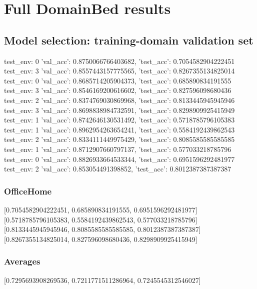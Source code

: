 \documentclass{article}
\begin{document}
\section{Full DomainBed results}

\subsection{Model selection: training-domain validation set}
test_env: 0
{'val_acc': 0.8750066766403682, 'test_acc': 0.7054582904222451}
test_env: 3
{'val_acc': 0.8557443157775565, 'test_acc': 0.8267355134825014}
test_env: 0
{'val_acc': 0.8685714205904373, 'test_acc': 0.685890834191555}
test_env: 3
{'val_acc': 0.8546169200616602, 'test_acc': 0.827596098680436}
test_env: 2
{'val_acc': 0.8374769030869968, 'test_acc': 0.8133445945945946}
test_env: 3
{'val_acc': 0.8698838984732591, 'test_acc': 0.8298909925415949}
test_env: 1
{'val_acc': 0.8742646130531492, 'test_acc': 0.5718785796105383}
test_env: 1
{'val_acc': 0.8962954263654241, 'test_acc': 0.5584192439862543}
test_env: 2
{'val_acc': 0.8334111449975429, 'test_acc': 0.8085585585585585}
test_env: 1
{'val_acc': 0.8712907660797137, 'test_acc': 0.577033218785796}
test_env: 0
{'val_acc': 0.8826933664533344, 'test_acc': 0.6951596292481977}
test_env: 2
{'val_acc': 0.853054491398852, 'test_acc': 0.8012387387387387}

\subsubsection{OfficeHome}
[0.7054582904222451, 0.685890834191555, 0.6951596292481977]
[0.5718785796105383, 0.5584192439862543, 0.577033218785796]
[0.8133445945945946, 0.8085585585585585, 0.8012387387387387]
[0.8267355134825014, 0.827596098680436, 0.8298909925415949]

\begin{center}
\end{center}

\subsubsection{Averages}
[0.7295693908269536, 0.7211771511286964, 0.7245545312546027]

\begin{center}
\end{center}
\end{document}
